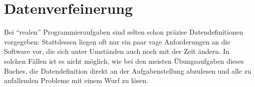 
\section{Datenverfeinerung}

Bei "`realen"' Programmieraufgaben sind selten schon präzise
Datendefinitionen vorgegeben: Stattdessen liegen oft nur ein paar vage
Anforderungen an die Software vor, die sich unter Umständen auch noch
mit der Zeit ändern.  In solchen Fällen ist es nicht möglich, wie bei
den meisten Übungsaufgaben dieses Buches, die Datendefinition direkt
an der Aufgabenstellung abzulesen und alle zu anfallenden Probleme mit
einem Wurf zu lösen.

